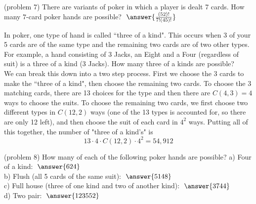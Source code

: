 \documentclass[handout]{ximera}
\begin{document}
\begin{problem}(problem 7)
There are variants of poker in which a player is dealt 7 cards. How many $7$-card poker hands are possible? $\; \answer{\frac{(52)!}{7!(45)!}}$
\end{problem}

\begin{example}[example 8] 
In poker, one type of hand is called ``three of a kind". This occurs when 3 of your 5 cards are of 
the same type and the remaining two cards are of two other types.  For example, a hand consisting of 3 Jacks, an 
Eight and a Four (regardless of suit) is a three of a kind (3 Jacks). How many three of a kinds are possible?\\
We can break this down into a two step process.  First we choose the 3 cards to make the ``three of a kind", 
then choose the remaining two cards. To choose the 3 matching cards, there are 13 choices for the type and 
then there are $C(4, 3) =4$ ways to choose the suits.  To choose the remaining two cards, 
we first choose two different types in $C(12, 2)$ ways (one of the 13 types is accounted for, 
so there are only 12 left), and then choose the suit of each card in $4^2$ ways.
Putting all of this together, the number of "three of a kind's" is
\[
13 \cdot 4 \cdot C(12, 2) \cdot 4^2 = 54, 912
\]

\end{example}

\begin{problem}(problem 8)
How many of each of the following poker hands are possible?
a) Four of a kind: $\; \answer{624}$\\
b) Flush (all 5 cards of the same suit): $\; \answer{5148}$\\
c) Full house (three of one kind and two of another kind): $\; \answer{3744}$\\
d) Two pair: $\; \answer{123552}$
\end{problem}
\end{document}
